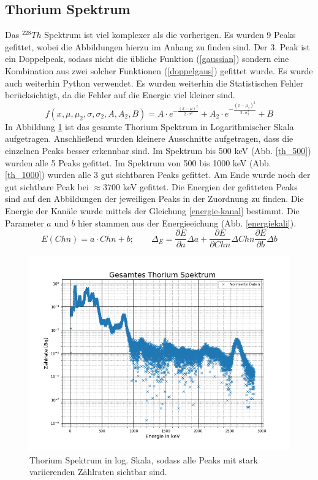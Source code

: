 \subsection{Thorium Spektrum}
Das $^{228}Th$ Spektrum ist viel komplexer als die vorherigen. Es wurden 9 Peaks gefittet, wobei die Abbildungen hierzu im Anhang zu finden sind. Der 3. Peak ist ein Doppelpeak, sodass nicht die übliche Funktion (\ref{gaussian}) sondern eine Kombination aus zwei solcher Funktionen (\ref{doppelgaus}) gefittet wurde. Es wurde auch weiterhin Python \cite{SciPy_Opti} verwendet. Es wurden weiterhin die Statistischen Fehler berücksichtigt, da die Fehler auf die Energie viel kleiner sind.
\begin{equation}
	f(x,\mu,\mu_2,\sigma,\sigma_2,A,A_2,B) = 
	 A \cdot e ^{-\frac{(x - \mu) ^ 2}{2 \cdot \sigma ^ 2}} + 
	 A_2 \cdot e ^{-\frac{(x - \mu_2) ^ 2}{2 \cdot \sigma_2 ^ 2}} + 
	 B
	 \label{doppelgaus}
\end{equation}
In Abbildung \ref{thorium} ist das gesamte Thorium Spektrum in Logarithmischer Skala aufgetragen. Anschließend wurden kleinere Ausschnitte aufgetragen, dass die einzelnen Peaks besser erkennbar sind. Im Spektrum bis 500 keV (Abb. \ref{th_500}) wurden alle 5 Peaks gefittet. Im Spektrum von 500 bis 1000 keV (Abb. \ref{th_1000}) wurden alle 3 gut sichtbaren Peaks gefittet. Am Ende wurde noch der gut sichtbare Peak bei $\approx 3700$ keV gefittet. Die Energien der gefitteten Peaks sind auf den Abbildungen der jeweiligen Peaks in der Zuordnung zu finden.
Die Energie der Kanäle wurde mittels der Gleichung \ref{energie-kanal} bestimmt. Die Parameter $a$ und $b$ hier stammen aus der Energieeichung (Abb. \ref{energiekali}).
\begin{equation}
	E\left(Chn\right) = a \cdot Chn + b ; \qquad \Delta_E = \frac{\partial E}{\partial a} \Delta a + \frac{\partial E}{\partial Chn} \Delta Chn \frac{\partial E}{\partial b} \Delta b
	\label{energie-kanal}
\end{equation}

\begin{figure}[h]
	\centering
	\includegraphics[scale=0.7]{Bilder/Th_ganz}
	\caption[Gesamtes Thorium Spektrum]{\small Thorium Spektrum in log. Skala, sodass alle Peaks mit stark variierenden Zählraten sichtbar sind.}
	\label{thorium}
\end{figure}

